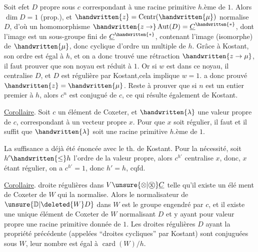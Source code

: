 Soit  efet $D$  propre sous $c$ correspondant à une racine primitive $h$.ème de $1$. Alors $\dim D=1$ (prop.), et $\handwritten{z}=\operatorname{Centr}(\handwritten{\mu})$ normalise $D$, d'où un homomorphisme $\handwritten{z\to}\operatorname{Aut}(D)=\underline{C}^{\handwritten{*}}$, dont l'image est un sous-groupe fini de $\underline{C}^{\handwritten{*}}$, contenant l'image (isomorphe) de $\handwritten{\mu}$, donc cyclique d'ordre un multiple de $h$. Grâce à Kostant, son ordre est égal à $h$, et on a donc trouvé une rétraction $\handwritten{z\to\mu}$, il faut prouver que son noyau est réduit à $1$. Or si $w$ est dans ce noyau, il  centralise $D$, et  $D$ est régulière par Kostant,cela implique $w=1$.  a donc prouvé $\handwritten{z}=\handwritten{\mu}$. Reste à prouver que si $n$ est un entier premier à $h$, alors $c^n$ est conjugué de $c$, ce qui résulte également de Kostant.

\uline{Corollaire}. Soit $c$ un élément de Coxeter, et $\handwritten{\lambda}$ une valeur propre de $c$, correspondant à un vecteur propre $x$. Pour que $x$ soit régulier, il faut et il suffit que $\handwritten{\lambda}$ soit une racine primitive $h$.ème de $1$.

La suffisance a déjà été énoncée avec le th. de Kostant. Pour la nécessité, soit $h'\handwritten{\leq}h$ l'ordre de la valeur propre, alors $c^{h'}$ centralise $x$, donc, $x$ étant régulier, on a $c^{h'}=1$, donc $h'=h$, cqfd.

\uline{Corollaire}.   droite régulières dans $V\unsure{\otimes|\mathbin{\text{\textcircled{x}}}}\underline{C}$ telle qu'il existe un élé%
ment de Coxeter de $W$ qui la normalise. Alors le normalisateur de $\unsure{\mathbb{D}|\deleted{W}D}$ dans $W$ est le groupe engendré par $c$, et il existe une unique élément de Coxeter de $W$ normalisant $D$ et y ayant pour valeur propre une racine primitive donnée de $1$. Les droites régulières $D$ ayant la propriété précédente (appelées ``droites cycliques'' par Kostant) sont conjuguées sous $W$, leur nombre est égal à $\operatorname{card}(W)/h$.

